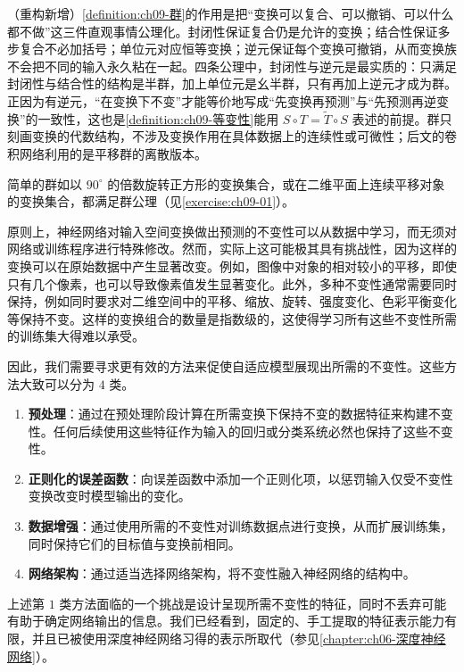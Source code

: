 \documentclass[../../main.tex]{subfiles}
\begin{document}
\begin{remark}（重构新增）\cref{definition:ch09-群}的作用是把“变换可以复合、可以撤销、可以什么都不做”这三件直观事情公理化。封闭性保证复合仍是允许的变换；结合性保证多步复合不必加括号；单位元对应恒等变换；逆元保证每个变换可撤销，从而变换族不会把不同的输入永久粘在一起。四条公理中，封闭性与逆元是最实质的：只满足封闭性与结合性的结构是半群，加上单位元是幺半群，只有再加上逆元才成为群。正因为有逆元，“在变换下不变”才能等价地写成“先变换再预测”与“先预测再逆变换”的一致性，这也是\cref{definition:ch09-等变性}能用 $S\circ T=\tilde T\circ S$ 表述的前提。群只刻画变换的代数结构，不涉及变换作用在具体数据上的连续性或可微性；后文的卷积网络利用的是平移群的离散版本。
\end{remark}

简单的群如以 $90^{\circ}$ 的倍数旋转正方形的变换集合，或在二维平面上连续平移对象的变换集合，都满足群公理（见\cref{exercise:ch09-01}）。

原则上，神经网络对输入空间变换做出预测的不变性可以从数据中学习，而无须对网络或训练程序进行特殊修改。然而，实际上这可能极其具有挑战性，因为这样的变换可以在原始数据中产生显著改变。例如，图像中对象的相对较小的平移，即使只有几个像素，也可以导致像素值发生显著变化。此外，多种不变性通常需要同时保持，例如同时要求对二维空间中的平移、缩放、旋转、强度变化、色彩平衡变化等保持不变。这样的变换组合的数量是指数级的，这使得学习所有这些不变性所需的训练集大得难以承受。

因此，我们需要寻求更有效的方法来促使自适应模型展现出所需的不变性。这些方法大致可以分为 $4$ 类。
\begin{enumerate}
\item \textbf{预处理}：通过在预处理阶段计算在所需变换下保持不变的数据特征来构建不变性。任何后续使用这些特征作为输入的回归或分类系统必然也保持了这些不变性。
\item \textbf{正则化的误差函数}：向误差函数中添加一个正则化项，以惩罚输入仅受不变性变换改变时模型输出的变化。
\item \textbf{数据增强}：通过使用所需的不变性对训练数据点进行变换，从而扩展训练集，同时保持它们的目标值与变换前相同。
\item \textbf{网络架构}：通过适当选择网络架构，将不变性融入神经网络的结构中。
\end{enumerate}

上述第 $1$ 类方法面临的一个挑战是设计呈现所需不变性的特征，同时不丢弃可能有助于确定网络输出的信息。我们已经看到，固定的、手工提取的特征表示能力有限，并且已被使用深度神经网络习得的表示所取代（参见\cref{chapter:ch06-深度神经网络}）。
\end{document}
